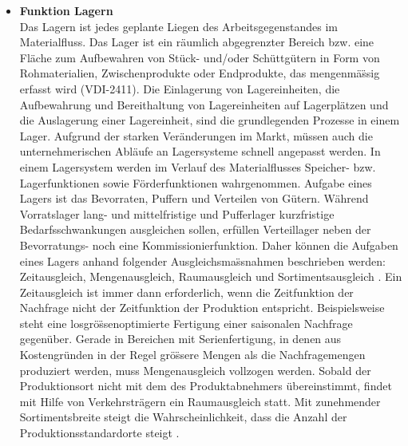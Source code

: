 \begin{itemize}
\item \textbf{Funktion Lagern} \\
Das Lagern ist jedes geplante Liegen des Arbeitsgegenstandes im Materialfluss. Das Lager ist ein r\"aumlich abgegrenzter Bereich bzw. eine Fl\"ache zum Aufbewahren von St\"uck- und/oder Sch\"uttg\"utern in Form von Rohmaterialien, Zwischenprodukte oder Endprodukte, das mengenm\"a\"ssig erfasst wird (VDI-2411). Die Einlagerung von Lagereinheiten, die Aufbewahrung und Bereithaltung von Lagereinheiten auf Lagerpl\"atzen und die Auslagerung einer Lagereinheit, sind die grundlegenden Prozesse in einem Lager.
Aufgrund der starken Ver\"anderungen im Markt, m\"ussen auch die unternehmerischen Abl\"aufe an Lagersysteme schnell angepasst werden. In einem Lagersystem werden im Verlauf des Materialflusses Speicher- bzw. Lagerfunktionen sowie F\"orderfunktionen wahrgenommen. 
Aufgabe eines Lagers ist das Bevorraten, Puffern und Verteilen von G\"utern. W\"ahrend Vorratslager lang- und mittelfristige und Pufferlager kurzfristige Bedarfsschwankungen ausgleichen sollen, erf\"ullen Verteillager neben der Bevorratungs- noch eine Kommissionierfunktion. Daher k\"onnen die Aufgaben eines Lagers anhand folgender Ausgleichsma\"ssnahmen beschrieben werden: Zeitausgleich, Mengenausgleich, Raumausgleich und Sortimentsausgleich \cite{Stich:Bruckner:2002}. Ein Zeitausgleich ist immer dann erforderlich, wenn die Zeitfunktion der Nachfrage nicht der Zeitfunktion der Produktion entspricht. Beispielsweise steht eine losgr\"o\"ssenoptimierte Fertigung einer saisonalen Nachfrage gegen\"uber. Gerade in Bereichen mit Serienfertigung, in denen aus Kostengr\"unden in der Regel gr\"o\"ssere Mengen als die Nachfragemengen produziert werden, muss Mengenausgleich vollzogen werden. Sobald der Produktionsort nicht mit dem des Produktabnehmers \"ubereinstimmt, findet mit Hilfe von Verkehrstr\"agern ein Raumausgleich statt. Mit zunehmender Sortimentsbreite steigt die Wahrscheinlichkeit, dass die Anzahl der Produktionsstandardorte steigt \cite[S. 14]{Langenbach:2012}.


\end{itemize}
